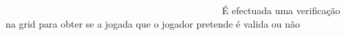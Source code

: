 ~\newline
~\newline
~\newline
~\newline
~\newline
~\newline
~\newline
~\newline
~\newline
~\newline
~\newline
~\newline
~\newline
~\newline
~\newline
~\newline
~\newline
~\newline
~\newline
~\newline
~\newline
~\newline
~\newline
~\newline
~\newline
~\newline
~\newline
 É efectuada uma verificação na grid para obter se a jogada que o jogador pretende é valida ou não ~\newline
~\newline
~\newline
~\newline
~\newline
~\newline
~\newline
~\newline
~\newline
~\newline
~\newline
~\newline
~\newline
~\newline
~\newline
~\newline
~\newline
~\newline
~\newline
~\newline
~\newline
~\newline
~\newline
~\newline
